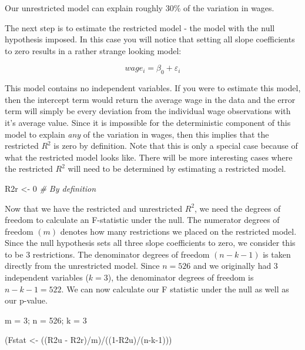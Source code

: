\documentclass[
]{book}
\newenvironment{Shaded}{\begin{snugshade}}{\end{snugshade}}
\newcommand{\CommentTok}[1]{\textcolor[rgb]{0.56,0.35,0.01}{\textit{#1}}}
\newcommand{\DecValTok}[1]{\textcolor[rgb]{0.00,0.00,0.81}{#1}}
\newcommand{\NormalTok}[1]{#1}
\newcommand{\OtherTok}[1]{\textcolor[rgb]{0.56,0.35,0.01}{#1}}
\newcommand{\SpecialCharTok}[1]{\textcolor[rgb]{0.00,0.00,0.00}{#1}}
\begin{document}
Our unrestricted model can explain roughly 30\% of the variation in wages.

The next step is to estimate the restricted model - the model with the null hypothesis imposed. In this case you will notice that setting all slope coefficients to zero results in a rather strange looking model:

\[wage_i=\beta_0+\varepsilon_i\]

This model contains no independent variables. If you were to estimate this model, then the intercept term would return the average wage in the data and the error term will simply be every deviation from the individual wage observations with it's average value. Since it is impossible for the deterministic component of this model to explain \emph{any} of the variation in wages, then this implies that the restricted \(R^2\) is zero by definition. Note that this is only a special case because of what the restricted model looks like. There will be more interesting cases where the restricted \(R^2\) will need to be determined by estimating a restricted model.

\begin{Shaded}
\begin{Highlighting}[]
\NormalTok{R2r }\OtherTok{\textless{}{-}} \DecValTok{0} \CommentTok{\# By definition}
\end{Highlighting}
\end{Shaded}

Now that we have the restricted and unrestricted \(R^2\), we need the degrees of freedom to calculate an F-statistic under the null. The numerator degrees of freedom \((m)\) denotes how many restrictions we placed on the restricted model. Since the null hypothesis sets all three slope coefficients to zero, we consider this to be 3 restrictions. The denominator degrees of freedom \((n-k-1)\) is taken directly from the unrestricted model. Since \(n=526\) and we originally had 3 independent variables (\(k=3\)), the denominator degrees of freedom is \(n-k-1=522\). We can now calculate our F statistic under the null as well as our p-value.

\begin{Shaded}
\begin{Highlighting}[]
\NormalTok{m }\OtherTok{=} \DecValTok{3}\NormalTok{; n }\OtherTok{=} \DecValTok{526}\NormalTok{; k }\OtherTok{=} \DecValTok{3}

\NormalTok{(Fstat }\OtherTok{\textless{}{-}}\NormalTok{ ((R2u }\SpecialCharTok{{-}}\NormalTok{ R2r)}\SpecialCharTok{/}\NormalTok{m)}\SpecialCharTok{/}\NormalTok{((}\DecValTok{1}\SpecialCharTok{{-}}\NormalTok{R2u)}\SpecialCharTok{/}\NormalTok{(n}\SpecialCharTok{{-}}\NormalTok{k}\DecValTok{{-}1}\NormalTok{)))}
\end{Highlighting}
\end{Shaded}
\end{document}
